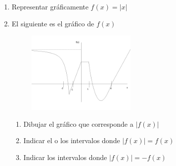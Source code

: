 \documentclass[12pt]{article}
\theoremstyle{definition}
\newtheorem*{mydef}{Definición}
\begin{document}
\begin{enumerate}

\item Representar gráficamente  $f(x) = |x|$
\item El siguiente es el gráfico de $f(x)$
\begin{figure}[H]
\centering
\includegraphics[width=0.5\textwidth]{TP2-1.png}
\end{figure}

\begin{enumerate}
\item Dibujar el gráfico que corresponde a $|f(x)|$ 
\item Indicar el o los intervalos donde $|f(x)| = f(x)$ 
\item Indicar los intervalos donde $|f(x)| = -f(x)$ 
\end{enumerate}


\end{enumerate}
\end{document}
